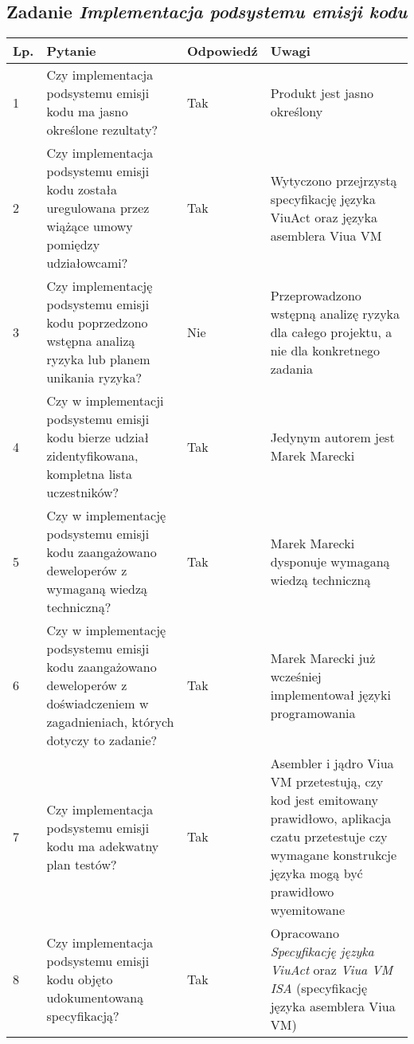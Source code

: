 \documentclass[11pt,oneside,a4paper,titlepage,onecolumn]{article}
\begin{document}
\subsection{Zadanie \textit{Implementacja podsystemu emisji kodu}}

\begin{tabularx}{\textwidth}{|l|X|l|X|}
	\hline

	\hline
    Lp. & Pytanie & Odpowiedź & Uwagi \\ \hline
    
    1 
    & Czy implementacja podsystemu emisji kodu ma jasno określone 
    rezultaty?
    & Tak
    & Produkt jest jasno określony
    \\\hline

    2
	& Czy implementacja podsystemu emisji kodu została uregulowana
	przez wiążące umowy pomiędzy udziałowcami?
	& Tak
	& Wytyczono przejrzystą specyfikację języka ViuAct oraz języka
	asemblera Viua VM
	\\\hline	
	
	3
	& Czy implementację podsystemu emisji kodu poprzedzono wstępna
	analizą	ryzyka lub planem unikania ryzyka?
	& Nie
	& Przeprowadzono wstępną analizę ryzyka dla całego projektu, a
	nie dla konkretnego zadania
	\\\hline
	
	4
	& Czy w implementacji podsystemu emisji kodu bierze udział 
	zidentyfikowana, kompletna lista uczestników?
	& Tak
	& Jedynym autorem jest Marek Marecki
	\\\hline

	5
	& Czy w implementację podsystemu emisji kodu zaangażowano
	deweloperów z wymaganą wiedzą techniczną?
	& Tak
	& Marek Marecki dysponuje wymaganą wiedzą techniczną
	\\\hline
	
	6
	& Czy w implementację podsystemu emisji kodu zaangażowano
	deweloperów z doświadczeniem w zagadnieniach, których dotyczy 
	to zadanie?
	& Tak
	& Marek Marecki już wcześniej implementował języki programowania
	\\\hline

	7
	& Czy implementacja podsystemu emisji kodu ma adekwatny plan
	testów?
	& Tak
	& Asembler i jądro Viua VM przetestują, czy kod jest emitowany
	prawidłowo, aplikacja czatu przetestuje czy wymagane konstrukcje
	języka mogą być prawidłowo wyemitowane
	\\\hline	
	
	8
	& Czy implementacja podsystemu emisji kodu objęto udokumentowaną
	specyfikacją?
	& Tak
	& Opracowano \textit{Specyfikację języka ViuAct} oraz 
	\textit{Viua VM ISA} (specyfikację języka asemblera Viua VM)
	\\\hline
\end{tabularx}
	
\end{document}

